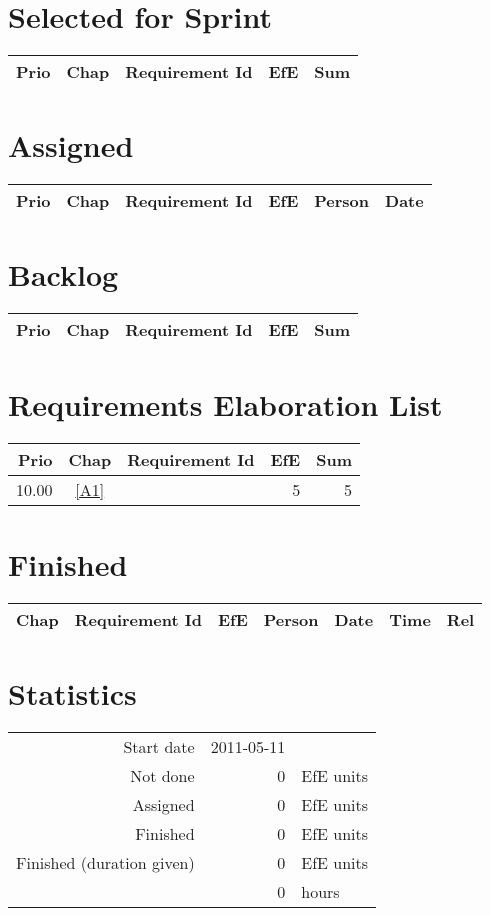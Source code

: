 \section{Selected for Sprint}
\begin{longtable}{|r|c|p{7cm}||r|r|} \hline
\textbf{Prio} & \textbf{Chap} & \textbf{Requirement Id} & \textbf{EfE} & \textbf{Sum} \\ \hline\endhead
\end{longtable}\section{Assigned}
\begin{longtable}{|r|c|p{6.5cm}||r|l|l|} \hline
\textbf{Prio} & \textbf{Chap} & \textbf{Requirement Id} & \textbf{EfE} & \textbf{Person} & \textbf{Date} \\ \hline\endhead
\end{longtable}\section{Backlog}
\begin{longtable}{|r|c|p{7cm}||r|r|} \hline
\textbf{Prio} & \textbf{Chap} & \textbf{Requirement Id} & \textbf{EfE} & \textbf{Sum} \\ \hline\endhead
\end{longtable}\section{Requirements Elaboration List}
\begin{longtable}{|r|c|p{7cm}||r|r|} \hline
\textbf{Prio} & \textbf{Chap} & \textbf{Requirement Id} & \textbf{EfE} & \textbf{Sum} \\ \hline\endhead
10.00 & \ref{A1} & \nameref{A1} & 5 & 5 \\ \hline
\end{longtable}\section{Finished}
{\small \begin{longtable}{|c|p{5.5cm}||r|l|l|r|r|} \hline
\textbf{Chap} & \textbf{Requirement Id} & \textbf{EfE} & \textbf{Person} & \textbf{Date} & \textbf{Time} & \textbf{Rel} \\ \hline\endhead
\end{longtable}}\section{Statistics}
\begin{longtable}{rrl}
Start date & 2011-05-11 & \\ 
Not done & 0 & EfE units \\ 
Assigned & 0 & EfE units \\ 
Finished & 0 & EfE units \\ 
Finished (duration given) & 0 & EfE units \\ 
 & 0 & hours \\ 
\end{longtable}